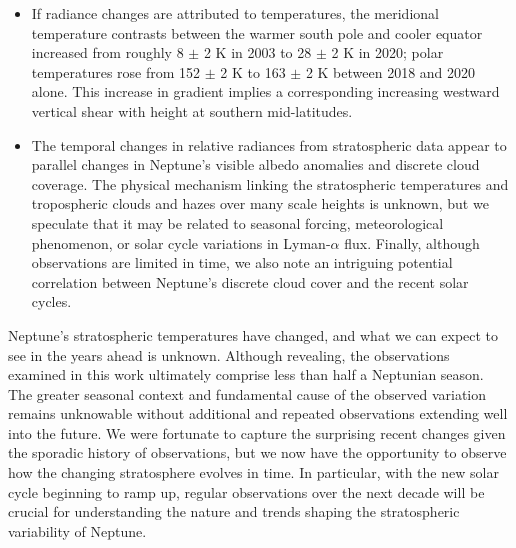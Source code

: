 \documentclass[twocolumn,10pt]{aastex631}
\begin{document}
\begin{itemize}
  \item If radiance changes are attributed to temperatures, the meridional temperature contrasts between the warmer south pole and cooler equator increased from roughly 8 $\pm$ 2 K in 2003 to 28 $\pm$ 2 K in 2020; polar temperatures rose from 152 $\pm$ 2  K to 163 $\pm$ 2  K between 2018 and 2020 alone.  This increase in gradient implies a corresponding increasing westward vertical shear with height at southern mid-latitudes.

  \item The temporal changes in relative radiances from stratospheric data appear to parallel changes in Neptune's visible albedo anomalies and discrete cloud coverage. The physical mechanism linking the stratospheric temperatures and tropospheric clouds and hazes over many scale heights is unknown, but we speculate that it may be related to seasonal forcing, meteorological phenomenon, or solar cycle variations in Lyman-$\alpha$ flux. Finally, although observations are limited in time, we also note an intriguing potential correlation between Neptune's discrete cloud cover \citep{karkoschka2011neptune} and the recent solar cycles.
\end{itemize}

Neptune's stratospheric temperatures have changed, and what we can expect to see in the years ahead is unknown. Although revealing, the observations examined in this work ultimately comprise less than half a Neptunian season.  The greater seasonal context and fundamental cause of the observed variation remains unknowable without additional and repeated observations extending well into the future. We were fortunate to capture the surprising recent changes given the sporadic history of observations, but we now have the opportunity to observe how the changing stratosphere evolves in time. In particular, with the new solar cycle beginning to ramp up, regular observations over the next decade will be crucial for understanding the nature and trends shaping the stratospheric variability of Neptune.
\clearpage
\end{document}
